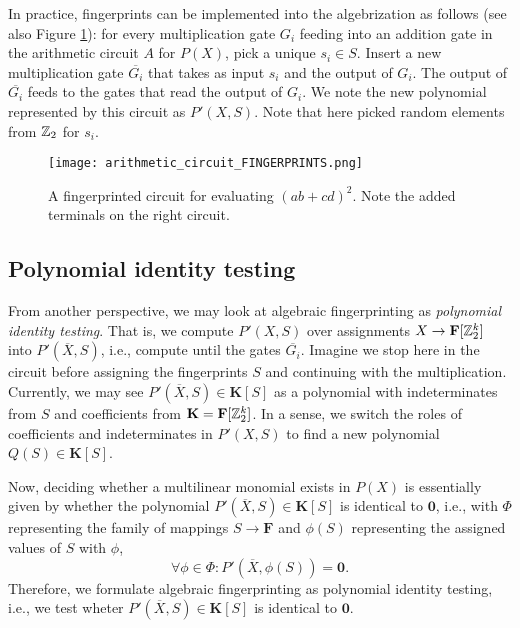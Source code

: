 In practice, fingerprints can be implemented 
into the algebrization as follows (see also Figure \ref{fig:circuit_fingerprints}): 
for every multiplication gate $G_i$ feeding into an addition gate 
in the arithmetic circuit $A$ for $P(X)$, 
pick a unique $s_i \in S$. Insert a new multiplication gate $\overbar{G_i}$ that takes 
as input $s_i$ and the output of $G_i$. The output of $\overbar{G_i}$ feeds to the 
gates that read the output of $G_i$. We note the new polynomial represented by this circuit 
as $P'(X, S)$. Note that here 
\citeauthor{Koutis08} picked random elements from $\mathbb Z_2$ for $s_i$.

\begin{figure}[h]
  \texttt{[image: arithmetic\_circuit\_FINGERPRINTS.png]}
  \centering
  \caption{A fingerprinted circuit for evaluating $(ab+cd)^2$. 
  Note the added terminals on the right circuit.}
  \label{fig:circuit_fingerprints}
\end{figure}

\subsection{Polynomial identity testing}
\label{sect:polynomial_identity_testing}

From another perspective, we may look at algebraic fingerprinting as \emph{polynomial identity testing}. 
That is, we compute $P'(X, S)$ over assignments $X \to \mathbf{F}[\mathbb Z_2^k]$ into $P'(\overbar{X}, S)$, i.e., 
compute until the gates $\overbar{G_i}$. 
Imagine we stop here in the circuit before assigning the fingerprints $S$  
and continuing with the multiplication. 
Currently, we may see $P'(\overbar{X}, S) \in \mathbf{K}[S]$ as a polynomial 
with indeterminates from $S$ and coefficients from $\mathbf{K} = \mathbf{F}[\mathbb Z_2^k]$. 
In a sense, we switch the roles of coefficients and indeterminates in $P'(X, S)$ 
to find a new polynomial $Q(S) \in \mathbf{K}[S]$. 

Now, deciding whether a multilinear monomial exists in $P(X)$ is essentially given by 
whether the polynomial $P'(\overbar{X}, S) \in \mathbf{K}[S]$ is identical to $\mathbf{0}$, 
i.e., with $\Phi$ representing the family of mappings $S \to \mathbf{F}$ 
and $\phi(S)$ representing the assigned values of $S$ with $\phi$,  
\[
  \forall \phi \in \Phi %
  \colon P'(\overbar{X}, \phi(S)) = \mathbf{0}.
\]
Therefore, we formulate algebraic fingerprinting as polynomial identity testing, i.e., 
we test wheter $P'(\overbar{X}, S) \in \mathbf{K}[S]$ is identical to $\mathbf{0}$.


